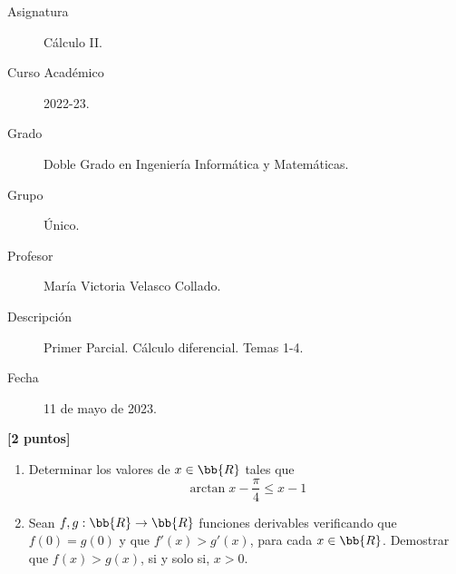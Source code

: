 \documentclass[12pt]{article}
\begin{document}

    
    

    \begin{description}
        \item[Asignatura] Cálculo II.
        \item[Curso Académico] 2022-23.
        \item[Grado] Doble Grado en Ingeniería Informática y Matemáticas.
        \item[Grupo] Único.
        \item[Profesor] María Victoria Velasco Collado.
        \item[Descripción] Primer Parcial. Cálculo diferencial. Temas 1-4.
        \item[Fecha] 11 de mayo de 2023.
    
    \end{description}
    \newpage
    
    \begin{ejercicio}\textbf{[2 puntos]}
\begin{enumerate}
    \item Determinar los valores de $x\in \bb{R}$ tales que
    \begin{equation*}
        \arctan x -\frac{\pi}{4} \leq x-1
    \end{equation*}

    \item Sean $f,g:\bb{R}\to \bb{R}$ funciones derivables verificando que $f(0)=g(0)$ y que $f'(x)>g'(x)$, para cada $x\in \bb{R}$. Demostrar que $f(x)>g(x)$, si y solo si, $x>0$.
\end{enumerate}
\end{ejercicio}
\end{document}
